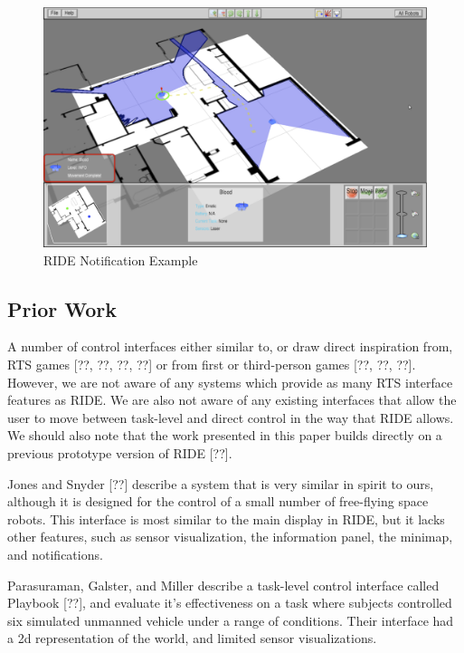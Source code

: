 \begin{figure}[ht]
\begin{center}
\includegraphics[width=6.10in]{images/ride-notification.png}
\caption{RIDE Notification Example\label{fig:ride-notification}}
\end{center}
\end{figure}

\subsection{Prior Work} %
\label{sub:hri_prior_work}
A number of control interfaces either similar to, or draw direct inspiration from, RTS games [??, ??, ??, ??] or from first or third-person games [??, ??, ??]. However, we are not aware of any systems which provide as many RTS interface features as RIDE. We are also not aware of any existing interfaces that allow the user to move between task-level and direct control in the way that RIDE allows. We should also note that the work presented in this paper builds directly on a previous prototype version of RIDE [??].

Jones and Snyder [??] describe a system that is very similar in spirit to ours, although it is designed for the control of a small number of free-flying space robots. This interface is most similar to the main display in RIDE, but it lacks other features, such as sensor visualization, the information panel, the minimap, and notifications.

Parasuraman, Galster, and Miller describe a task-level control interface called Playbook [??], and evaluate it’s effectiveness on a task where subjects controlled six simulated unmanned vehicle under a range of conditions. Their interface had a 2d representation of the world, and limited sensor visualizations.

